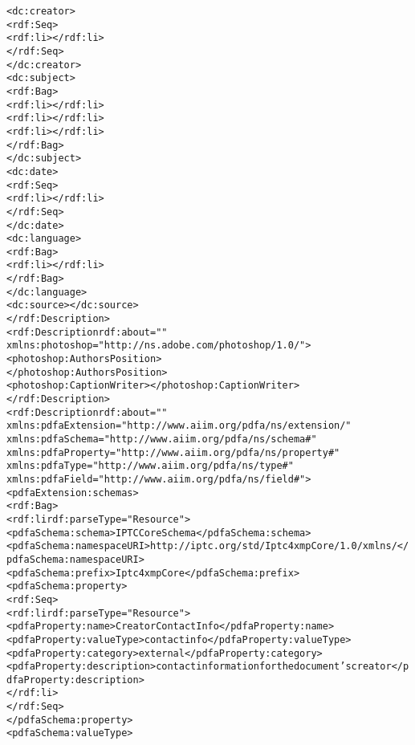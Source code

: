 \begin{alltt}
             <dc:creator>
                <rdf:Seq>
                   <rdf:li></rdf:li>
                </rdf:Seq>
             </dc:creator>
             <dc:subject>
                <rdf:Bag>
                   <rdf:li></rdf:li>
                   <rdf:li></rdf:li>
                   <rdf:li></rdf:li>
                </rdf:Bag>
             </dc:subject>
             <dc:date>
                <rdf:Seq>
                   <rdf:li></rdf:li>
                </rdf:Seq>
             </dc:date>
             <dc:language>
                <rdf:Bag>
                   <rdf:li></rdf:li>
                </rdf:Bag>
             </dc:language>
             <dc:source></dc:source>
          </rdf:Description>
          <rdf:Description rdf:about=""
                xmlns:photoshop="http://ns.adobe.com/photoshop/1.0/">
             <photoshop:AuthorsPosition>
             </photoshop:AuthorsPosition>
             <photoshop:CaptionWriter></photoshop:CaptionWriter>
          </rdf:Description>
          <rdf:Description rdf:about=""
              xmlns:pdfaExtension="http://www.aiim.org/pdfa/ns/extension/"
              xmlns:pdfaSchema="http://www.aiim.org/pdfa/ns/schema#"
              xmlns:pdfaProperty="http://www.aiim.org/pdfa/ns/property#"
              xmlns:pdfaType="http://www.aiim.org/pdfa/ns/type#"
              xmlns:pdfaField="http://www.aiim.org/pdfa/ns/field#">
            <pdfaExtension:schemas>
              <rdf:Bag>
                <rdf:li rdf:parseType="Resource">
                  <pdfaSchema:schema>IPTC Core Schema</pdfaSchema:schema>
                  <pdfaSchema:namespaceURI>http://iptc.org/std/Iptc4xmpCore/1.0/xmlns/</pdfaSchema:namespaceURI>
                  <pdfaSchema:prefix>Iptc4xmpCore</pdfaSchema:prefix>
                  <pdfaSchema:property>
                    <rdf:Seq>
                      <rdf:li rdf:parseType="Resource">
                        <pdfaProperty:name>CreatorContactInfo</pdfaProperty:name>
                        <pdfaProperty:valueType>contactinfo</pdfaProperty:valueType>
                        <pdfaProperty:category>external</pdfaProperty:category>
                        <pdfaProperty:description>contact information for the document's creator</pdfaProperty:description>
                      </rdf:li>
                    </rdf:Seq>
                  </pdfaSchema:property>
                  <pdfaSchema:valueType>

\end{alltt}
